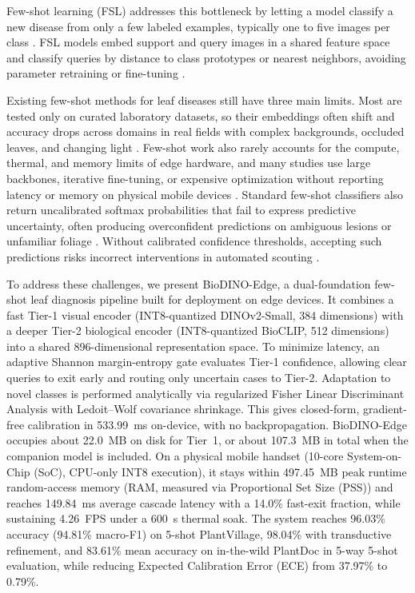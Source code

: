 \documentclass[preprint,12pt]{elsarticle}
\begin{document}
Few-shot learning (FSL) addresses this bottleneck by letting a model classify a new disease from only a few labeled examples, typically one to five images per class \cite{sun2024few}. FSL models embed support and query images in a shared feature space and classify queries by distance to class prototypes or nearest neighbors, avoiding parameter retraining or fine-tuning \cite{zhao2024mafde}.

Existing few-shot methods for leaf diseases still have three main limits. Most are tested only on curated laboratory datasets, so their embeddings often shift and accuracy drops across domains in real fields with complex backgrounds, occluded leaves, and changing light \cite{yang2024laboratory,kudo2025few}. Few-shot work also rarely accounts for the compute, thermal, and memory limits of edge hardware, and many studies use large backbones, iterative fine-tuning, or expensive optimization without reporting latency or memory on physical mobile devices \cite{babu2025agrifewnet,radocaj2025evolution}. Standard few-shot classifiers also return uncalibrated softmax probabilities that fail to express predictive uncertainty, often producing overconfident predictions on ambiguous lesions or unfamiliar foliage \cite{sharif2026real}. Without calibrated confidence thresholds, accepting such predictions risks incorrect interventions in automated scouting \cite{sharif2026real}.

To address these challenges, we present BioDINO-Edge, a dual-foundation few-shot leaf diagnosis pipeline built for deployment on edge devices. It combines a fast Tier-1 visual encoder (INT8-quantized DINOv2-Small, 384 dimensions) with a deeper Tier-2 biological encoder (INT8-quantized BioCLIP, 512 dimensions) into a shared 896-dimensional representation space. To minimize latency, an adaptive Shannon margin-entropy gate evaluates Tier-1 confidence, allowing clear queries to exit early and routing only uncertain cases to Tier-2. Adaptation to novel classes is performed analytically via regularized Fisher Linear Discriminant Analysis with Ledoit--Wolf covariance shrinkage. This gives closed-form, gradient-free calibration in 533.99~ms on-device, with no backpropagation. BioDINO-Edge occupies about 22.0~MB on disk for Tier~1, or about 107.3~MB in total when the companion model is included. On a physical mobile handset (10-core System-on-Chip (SoC), CPU-only INT8 execution), it stays within 497.45~MB peak runtime random-access memory (RAM, measured via Proportional Set Size (PSS)) and reaches 149.84~ms average cascade latency with a 14.0\% fast-exit fraction, while sustaining 4.26~FPS under a 600~s thermal soak. The system reaches 96.03\% accuracy (94.81\% macro-F1) on 5-shot PlantVillage, 98.04\% with transductive refinement, and 83.61\% mean accuracy on in-the-wild PlantDoc in 5-way 5-shot evaluation, while reducing Expected Calibration Error (ECE) from 37.97\% to 0.79\%.
\end{document}
